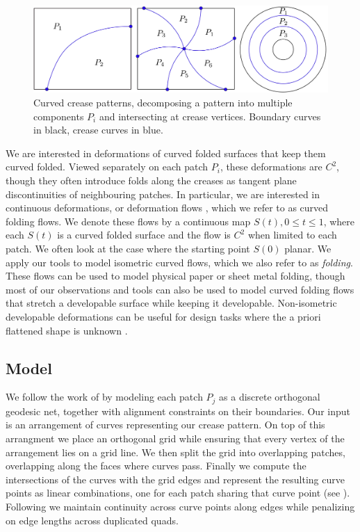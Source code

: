 \begin{figure} [h]
	\centering
	\includegraphics[width=\linewidth]{figures/crease_patterns}
	\caption{Curved crease patterns, decomposing a pattern into multiple components $P_i$ and intersecting at crease vertices. Boundary curves in black, crease curves in blue.}
	\label{fig:crease_pattern}
\end{figure}

We are interested in deformations of curved folded surfaces that keep them curved folded. Viewed separately on each patch $P_i$, these deformations are $C^2$, though they often introduce folds along the creases as tangent plane discontinuities of neighbouring patches. In particular, we are interested in continuous deformations, or deformation flows \cite{rabi2018shape}, which we refer to as curved folding flows. We denote these flows by a continuous map $S(t), 0 \leq t \leq 1$, where each $S(t)$ is a curved folded surface and the flow is $C^2$ when limited to each patch. We often look at the case where the starting point $S(0)$ planar. We apply our tools to model isometric curved flows, which we also refer to as \emph{folding}. These flows can be used to model physical paper or sheet metal folding, though most of our observations and tools can also be used to model curved folding flows that stretch a developable surface while keeping it developable. Non-isometric developable deformations can be useful for design tasks where the a priori flattened shape is unknown \cite{rabi18,rabi2018shape,pottmann_new}.

\subsection{Model} \label{sec:model}
We follow the work of \cite{rabi2018shape} by modeling each patch $P_j$ as a discrete orthogonal geodesic net, together with alignment constraints on their boundaries. Our input is an arrangement of curves representing our crease pattern. On top of this arrangment we place an orthogonal grid while ensuring that every vertex of the arrangement lies on a grid line. We then split the grid into overlapping patches, overlapping along the faces where curves pass. Finally we compute the intersections of the curves with the grid edges and represent the resulting curve points as linear combinations, one for each patch sharing that curve point (see ). Following \cite{rabi18} we maintain continuity across curve points along edges while penalizing on edge lengths across duplicated quads. 


